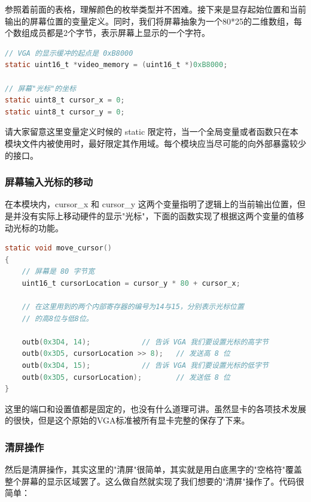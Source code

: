 \par 参照着前面的表格，理解颜色的枚举类型并不困难。接下来是显存起始位置和当前输出的屏幕位置的变量定义。同时，我们将屏幕抽象为一个80*25的二维数组，每个数组成员都是2个字节，表示屏幕上显示的一个字符。

\begin{lstlisting}[language = C, caption = drivers/console.c]
// VGA 的显示缓冲的起点是 0xB8000
static uint16_t *video_memory = (uint16_t *)0xB8000;

// 屏幕"光标"的坐标
static uint8_t cursor_x = 0;
static uint8_t cursor_y = 0;
\end{lstlisting}

\par 请大家留意这里变量定义时候的 static 限定符，当一个全局变量或者函数只在本模块文件内被使用时，最好限定其作用域。每个模块应当尽可能的向外部暴露较少的接口。

\subsubsection{屏幕输入光标的移动}

\par 在本模块内，cursor\_x 和 cursor\_y 这两个变量指明了逻辑上的当前输出位置，但是并没有实际上移动硬件的显示"光标"，下面的函数实现了根据这两个变量的值移动光标的功能。

\begin{lstlisting}[language = C, caption = drivers/console.c]
static void move_cursor()
{
	// 屏幕是 80 字节宽
	uint16_t cursorLocation = cursor_y * 80 + cursor_x;
	
	// 在这里用到的两个内部寄存器的编号为14与15，分别表示光标位置
	// 的高8位与低8位。

	outb(0x3D4, 14); 			// 告诉 VGA 我们要设置光标的高字节
	outb(0x3D5, cursorLocation >> 8); 	// 发送高 8 位
	outb(0x3D4, 15); 			// 告诉 VGA 我们要设置光标的低字节
	outb(0x3D5, cursorLocation);      	// 发送低 8 位
}
\end{lstlisting}

\par 这里的端口和设置值都是固定的，也没有什么道理可讲。虽然显卡的各项技术发展的很快，但是这个原始的VGA标准被所有显卡完整的保存了下来。

\subsubsection{清屏操作}

\par 然后是清屏操作，其实这里的"清屏"很简单，其实就是用白底黑字的"空格符"覆盖整个屏幕的显示区域罢了。这么做自然就实现了我们想要的"清屏"操作了。代码很简单：

